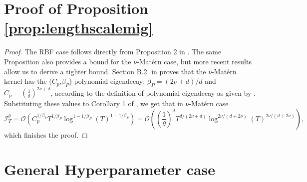 \documentclass{article}
\theoremstyle{plain}
\theoremstyle{definition}
\theoremstyle{remark}
\theoremstyle{plain}
\begin{document}






\newpage
\appendix
\section{Proof of Proposition \ref{prop:lengthscalemig}} \label{app:lengthscalemigproof}
\lengthscalemig*
\begin{proof}
    The RBF case follows directly from Proposition 2 in \cite{berkenkamp2019no}. The same Proposition also provides a bound for the $\nu$-Matérn case, but more recent results allow us to derive a tighter bound. Section B.2. in \cite{berkenkamp2019no} proves that the $\nu$-Matérn kernel has the ($C_p$,$\beta_P$) polynomial eigendecay:
    $\beta_P = (2\nu + d) / d$ and $C_p = \left(\frac{1}{\theta}\right)^{2\nu + d}$, according to the definition of polynomial eigendecay as given by \cite{vakili2021information}. Substituting these values to Corollary 1 of \cite{vakili2021information}, we get that in $\nu$-Matérn case 
    $$\mathcal{I}_T^\theta  = \mathcal{O}\left( C_p^{1/\beta_P}T^{1/\beta_P}\log^{1 - 1/\beta_P}(T)^{1 - 1/\beta_P}\right) = \mathcal{O}\left( \left(\frac{1}{\theta}\right)^{d}T^{d/(2\nu +d)}\log^{2\nu/(d + 2\nu)}(T)^{2\nu/(d + 2\nu)}\right) ,$$
    which finishes the proof.
\end{proof}

\section{General Hyperparameter case}
\begin{figure}[omitted: a diagram of this paper's results, not reproduced here]\label{fig:proofstrategy}\end{figure}
\end{document}
